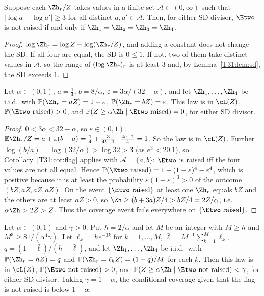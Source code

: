\documentclass[11pt]{report}
\begin{document}
\begin{T31corollary}\label{T31:cor:flag}
Suppose each $\Zh_r/Z$ takes values in a finite set $\mathcal A\subset(0,\infty)$ such that $|\log a-\log a'|\ge3$ for all
distinct $a,a'\in\mathcal A$. Then, for either SD divisor, $\Etwo$ is not raised if and only if
$\Zh_1=\Zh_2=\Zh_3=\Zh_4$.
\end{T31corollary}

\begin{proof}
$\log\Zh_r=\log Z+\log(\Zh_r/Z)$, and adding a constant does not change the SD. If all four are equal, the SD is
$0\le1$. If not, two of them take distinct values in $\mathcal A$, so the range of $(\log\Zh_r)_r$ is at least $3$ and, by
Lemma~\ref{T31:lem:sd}, the SD exceeds $1$.
\end{proof}

\begin{T31theorem}[Conclusion (d1)]\label{T31:thm:d1}
Let $\alpha\in(0,1)$, $a=\tfrac14$, $b=8/\alpha$, $\varepsilon=3\alpha/(32-\alpha)$, and let $\Zh_1,\dots,\Zh_4$ be
i.i.d.\ with $\mathbb{P}(\Zh_r=aZ)=1-\varepsilon$, $\mathbb{P}(\Zh_r=bZ)=\varepsilon$. This law is in $\cL(Z)$,
$\mathbb{P}(\Etwo\text{ raised})>0$, and $\mathbb{P}(Z\ge\alpha\Zh\mid\Etwo\text{ raised})=0$, for either SD divisor.
\end{T31theorem}

\begin{proof}
$0<3\alpha<32-\alpha$, so $\varepsilon\in(0,1)$. $\mathbb{E}\Zh_r/Z=a+\varepsilon(b-a)=\tfrac14+\frac{3}{4b-1}\cdot
\frac{4b-1}{4}=1$. So the law is in $\cL(Z)$. Further $\log(b/a)=\log(32/\alpha)>\log32>3$ (as $e^3<20.1$), so
Corollary~\ref{T31:cor:flag} applies with $\mathcal A=\{a,b\}$: $\Etwo$ is raised iff the four values are not all equal.
Hence $\mathbb{P}(\Etwo\text{ raised})=1-(1-\varepsilon)^4-\varepsilon^4$, which is positive because it is at least
the probability $\varepsilon(1-\varepsilon)^3>0$ of the outcome $(bZ,aZ,aZ,aZ)$. On the event $\{\Etwo\text{ raised}\}$ at
least one $\Zh_r$ equals $bZ$ and the others are at least $aZ>0$, so $\Zh\ge(b+3a)Z/4>bZ/4=2Z/\alpha$, i.e.\
$\alpha\Zh>2Z>Z$. Thus the coverage event fails everywhere on $\{\Etwo\text{ raised}\}$.
\end{proof}

\begin{T31theorem}[Conclusion (d2)]\label{T31:thm:d2}
Let $\alpha\in(0,1)$ and $\gamma>0$. Put $h=2/\alpha$ and let $M$ be an integer with $M\ge h$ and
$M^3\ge81/(\alpha^4\gamma)$. Let $\ell_k=he^{-3k}$ for $k=1,\dots,M$, $\bar\ell=M^{-1}\sum_{k=1}^M\ell_k$,
$q=(1-\bar\ell)/(h-\bar\ell)$, and let $\Zh_1,\dots,\Zh_4$ be i.i.d.\ with $\mathbb{P}(\Zh_r=hZ)=q$ and
$\mathbb{P}(\Zh_r=\ell_kZ)=(1-q)/M$ for each $k$. Then this law is in $\cL(Z)$, $\mathbb{P}(\Etwo\text{ not raised})>0$,
and $\mathbb{P}(Z\ge\alpha\Zh\mid\Etwo\text{ not raised})<\gamma$, for either SD divisor. Taking $\gamma=1-\alpha$, the
conditional coverage given that the flag is not raised is below $1-\alpha$.
\end{T31theorem}
\end{document}
